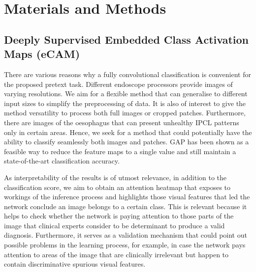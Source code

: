 \documentclass[runningheads]{llncs}
\begin{document}
\section{Materials and Methods}

\subsection{Deeply Supervised Embedded Class Activation Maps (eCAM)}

There are various reasons why a fully convolutional classification is convenient for the proposed pretext task. Different endoscope processors provide images of varying resolutions. We aim for a flexible method that can generalise to different input sizes to simplify the preprocessing of data. It is also of interest to give the method versatility to process both full images or cropped patches. Furthermore, there are images of the oesophagus that can present unhealthy IPCL patterns only in certain areas. Hence, we seek for a method that could potentially have the ability to classify seamlessly both images and patches. GAP \cite{Zhou2015} has been shown as a feasible way to reduce the feature maps to a single value and still maintain a state-of-the-art classification accuracy.

As interpretability of the results is of utmost relevance, in addition to the classification score, we aim to obtain an attention heatmap that exposes to workings of the inference process and highlights those visual features that led the network conclude an image belongs to a certain class. This is relevant because it helps to check whether the network is paying attention to those parts of the image that clinical experts consider to be determinant to produce a valid diagnosis. Furthermore, it serves as a validation mechanism that could point out possible problems in the learning process, for example, in case the network pays attention to areas of the image that are clinically irrelevant but happen to contain discriminative spurious visual features. 
\end{document}
